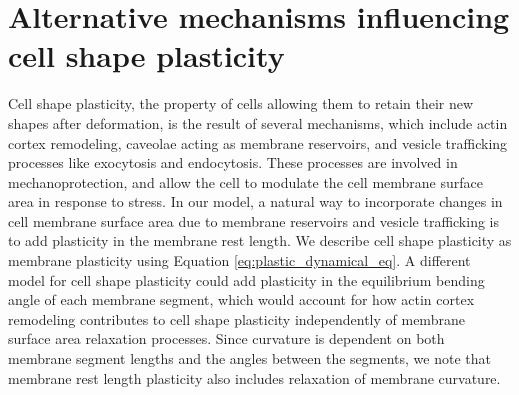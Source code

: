 \documentclass[%
 reprint,
superscriptaddress,
 amsmath,amssymb,
pre,
]{revtex4-2}
\begin{document}
\section{Alternative mechanisms influencing cell shape plasticity}
Cell shape plasticity, the property of cells allowing them to retain their new shapes after deformation, is the result of several mechanisms, which include actin cortex remodeling, caveolae acting as membrane reservoirs, and vesicle trafficking processes like exocytosis and endocytosis. These processes are involved in mechanoprotection, and allow the cell to modulate the cell membrane surface area in response to stress. In our model, a natural way to incorporate changes in cell membrane surface area due to membrane reservoirs and vesicle trafficking is to add plasticity in the membrane rest length. We describe cell shape plasticity as membrane plasticity using Equation \ref{eq:plastic_dynamical_eq}. A different model for cell shape plasticity could add plasticity in the equilibrium bending angle of each membrane segment, which would account for how actin cortex remodeling contributes to cell shape plasticity independently of membrane surface area relaxation processes. Since curvature is dependent on both membrane segment lengths and the angles between the segments, we note that membrane rest length plasticity also includes relaxation of membrane curvature. 
\end{document}
